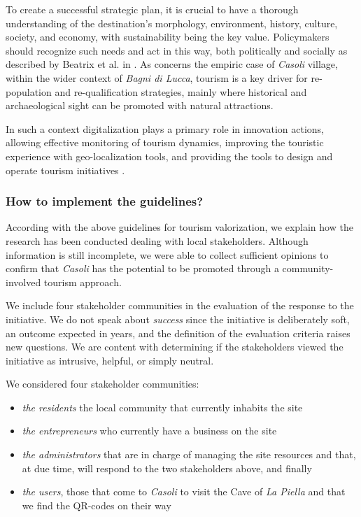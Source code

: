\documentclass[sustainability,article,submit,pdftex,moreauthors]{Definitions/mdpi}
\begin{document}
To create a successful strategic plan, it is crucial to have a thorough understanding of the destination's morphology, environment, history, culture, society, and economy, with sustainability being the key value.
Policymakers should recognize such needs and act in this way, both politically and socially as described by Beatrix et al. in \cite{bea10}. As concerns the empiric case of \emph{Casoli} village, within the wider context of \emph{Bagni di Lucca}, tourism is a key driver for re-population and re-qualification strategies, mainly where historical and archaeological sight can be promoted with natural attractions.

In such a context digitalization plays a primary role in innovation actions, allowing effective monitoring of tourism dynamics, improving the touristic experience with geo-localization tools, and providing the tools to design and operate tourism initiatives \cite{lem22}.

\subsubsection{How to implement the guidelines? \label{sec:agenda}}

According with the above guidelines for tourism valorization, we explain how the research has been conducted dealing with local stakeholders. Although information is still incomplete, we were able to collect sufficient opinions to confirm that \emph{Casoli} has the potential to be promoted through a community-involved tourism approach.

We include four stakeholder communities in the evaluation of the response to the initiative. We do not speak about {\em success} since the initiative is deliberately soft, an outcome expected in years, and the definition of the evaluation criteria raises new questions. We are content with determining if the stakeholders viewed the initiative as intrusive, helpful, or simply neutral.

We considered four stakeholder communities:

\begin{itemize}
	\item {\em the residents} the local community that currently inhabits the site
	\item {\em the entrepreneurs} who currently have a business on the site
	\item {\em the administrators} that are in charge of managing the site resources and that, at due time, will respond to the two stakeholders above, and finally
	\item {\em the users}, those that come to \emph{Casoli} to visit the Cave of \emph{La Piella} and that we find the QR-codes on their way
\end{itemize}
\end{document}
